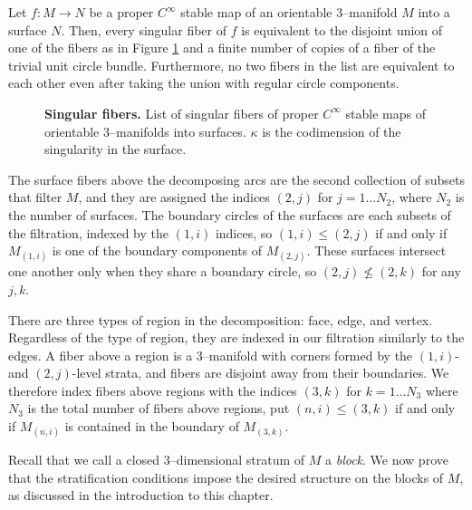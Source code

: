 \begin{theorem}
	Let $f:M\to N$ be a proper $C^\infty$ stable map of an orientable 3--manifold $M$ into a surface $N$.
	Then, every singular fiber of $f$ is equivalent to the disjoint union of one of the fibers as in Figure \ref{fig:saeki-fibers} and a finite number of copies of a fiber of the trivial unit circle bundle.
	Furthermore, no two fibers in the list are equivalent to each other even after taking the union with regular circle components.		
\end{theorem}

\begin{figure}[h!]
	\label{fig:saeki-fibers}
	\caption{
		\textbf{Singular fibers.}
		List of singular fibers of proper $C^\infty$ stable maps of orientable 3--manifolds into surfaces.
		$\kappa$ is the codimension of the singularity in the surface.
	}	
\end{figure}

The surface fibers above the decomposing arcs are the second collection of subsets that filter $M$, and they are assigned the indices $(2,j)$ for $j=1\dots N_2$, where $N_2$ is the number of surfaces.
The boundary circles of the surfaces are each subsets of the filtration, indexed by the $(1,i)$ indices, so $(1,i)\leq (2,j)$ if and only if $M_{(1,i)}$ is one of the boundary components of $M_{(2,j)}$.
These surfaces intersect one another only when they share a boundary circle, so $(2,j)\nleq (2,k)$ for any $j,k$.

There are three types of region in the decomposition: face, edge, and vertex.
Regardless of the type of region, they are indexed in our filtration similarly to the edges.
A fiber above a region is a 3--manifold with corners formed by the $(1,i)$- and $(2,j)$-level strata, and fibers are disjoint away from their boundaries.
We therefore index fibers above regions with the indices $(3,k)$ for $k=1\dots N_3$ where $N_3$ is the total number of fibers above regions, put $(n,i)\leq (3,k)$ if and only if $M_{(n,i)}$ is contained in the boundary of $M_{(3,k)}$.

Recall that we call a closed 3--dimensional stratum of $M$ a \emph{block}.
We now prove that the stratification conditions impose the desired structure on the blocks of $M$, as discussed in the introduction to this chapter.

